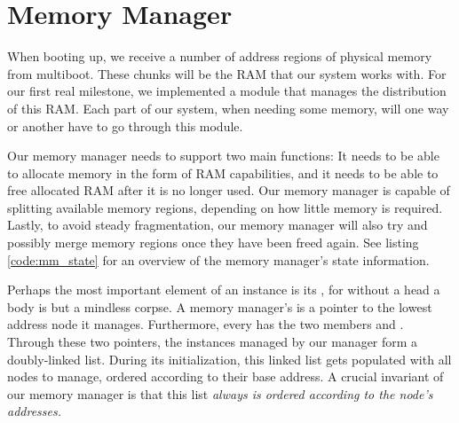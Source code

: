 \section{Memory Manager}
When booting up, we receive a number of address regions of physical memory from multiboot.
These chunks will be the RAM that our system works with. For our first real milestone,
we implemented a module that manages the distribution of this RAM. Each part of our system,
when needing some memory, will one way or another have to go through this module.

Our memory manager needs to support two main functions: It needs to be able to allocate memory in the form of RAM capabilities, and it needs to be able to free allocated RAM after it is no longer used. Our memory manager is capable of splitting available memory regions, depending on how little memory is required. Lastly, to avoid steady fragmentation, our memory manager will also try and possibly merge memory regions once they have been freed again. See listing \ref{code:mm_state} for an overview of the memory manager's state information.




Perhaps the most important element of an  instance is its , for without a head a body is but a mindless corpse. A memory manager's  is a pointer to the lowest address node it manages. Furthermore, every  has the two members  and . Through these two pointers, the  instances managed by our manager form a doubly-linked list. During its initialization, this linked list gets populated with all nodes to manage, ordered according to their base address. A crucial invariant of our memory manager is that this list \emph{always is ordered according to the node's addresses.}

